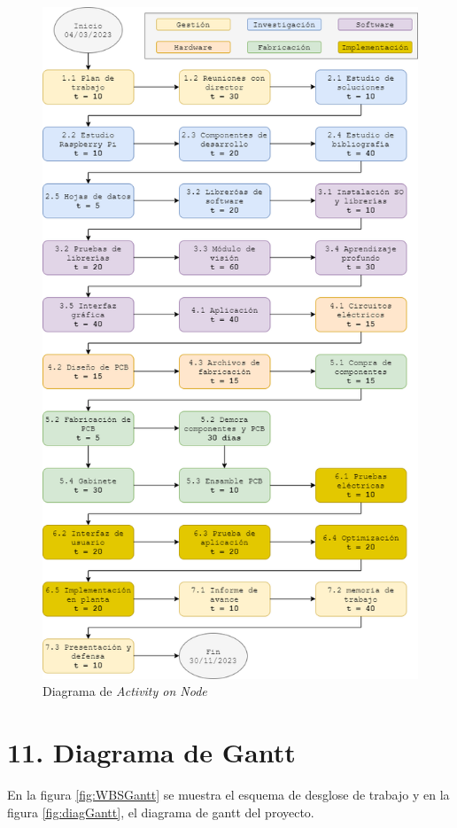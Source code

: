 \documentclass[
11pt, %
codirector, %
]{charter}
\begin{document}
\begin{figure}[htpb]
	\centering 
	\includegraphics[width=.8\textwidth]{./Figuras/AoN.png}
	\caption{Diagrama de \textit{Activity on Node}}
	\label{fig:AoN}
\end{figure}

\section{11. Diagrama de Gantt}
\label{sec:gantt}

En la figura \ref{fig:WBSGantt} se muestra el esquema de desglose de trabajo y en la figura \ref{fig:diagGantt}, el diagrama de gantt del proyecto.
\end{document}
